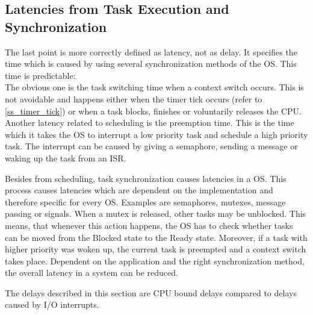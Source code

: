 \subsection{Latencies from Task Execution and Synchronization}
The last point is more correctly defined as latency, not as delay.
It specifies the time which is caused by using several synchronization methods of the \ac{OS}. 
This time is predictable:
\\The obvious one is the task switching time when a context switch occurs.
This is not avoidable and happens either when the timer tick occurs (refer to \ref{ss_timer_tick}) or when a task blocks, finishes or voluntarily releases the \ac{CPU}.
Another latency related to scheduling is the preemption time.
This is the time which it takes the \ac{OS} to interrupt a low priority task and schedule a high priority task.
The interrupt can be caused by giving a semaphore, sending a message or waking up the task from an \ac{ISR}.
\par
Besides from scheduling, task synchronization causes latencies in a \ac{OS}.
This process causes latencies which are dependent on the implementation and therefore specific for every \ac{OS}.
Examples are semaphores, mutexes, message passing or signals. 
When a mutex is released, other tasks may be unblocked.
This means, that whenever this action happens, the \ac{OS} has to check whether tasks can be moved from the Blocked state to the Ready state.
Moreover, if a task with higher priority was woken up, the current task is preempted and a context switch takes place.
Dependent on the application and the right synchronization method, the overall latency in a system can be reduced.
\par
The delays described in this section are \ac{CPU} bound delays compared to delays caused by \ac{I/O} interrupts.
 
